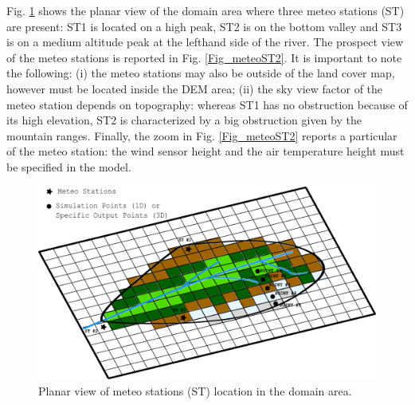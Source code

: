 \noindent Fig. \ref{Fig_meteoST1} shows the planar view of the domain area where three meteo stations (ST) are present: ST1 is located on a high peak, ST2 is on the bottom valley and ST3 is on a medium altitude peak at the lefthand side of the river. The prospect view of the meteo stations is reported in Fig. \ref{Fig_meteoST2}. It is important to note the following: (i) the meteo stations may also be outside of the land cover map, however must be located inside the DEM area; (ii) the sky view factor of the meteo station depends on topography: whereas ST1 has no obstruction because of its high elevation, ST2 is characterized by a big obstruction given by the mountain ranges.
Finally, the zoom in Fig. \ref{Fig_meteoST2} reports a particular of the meteo station: the wind sensor height and the air temperature height must be specified in the model.

\begin{figure}[t,b]
\begin{center}
\begin{minipage}[c]{1.0 \textwidth}
\centering
\includegraphics[width =1.0 \textwidth]{./images/pic_domain/foglia_LC_meteo.pdf}
\end{minipage}%
\end{center}
\caption{Planar view of meteo stations (ST) location in the domain area.}
\label{Fig_meteoST1}
\end{figure}


